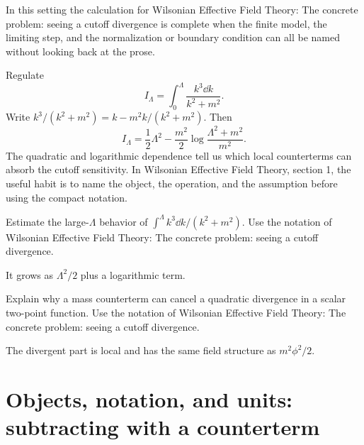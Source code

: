 In this setting the calculation for Wilsonian Effective Field Theory: The concrete problem: seeing a cutoff divergence is complete when the finite model, the limiting step, and the normalization or boundary condition can all be named without looking back at the prose.




\begin{example}
Regulate
\[
  I_\Lambda=\int_0^\Lambda\frac{k^3\dd k}{k^2+m^2}.
\]
Write \(k^3/(k^2+m^2)=k-m^2k/(k^2+m^2)\).  Then
\[
  I_\Lambda=\frac12\Lambda^2-\frac{m^2}{2}\log\frac{\Lambda^2+m^2}{m^2}.
\]
The quadratic and logarithmic dependence tell us which local counterterms can absorb the cutoff sensitivity.  In Wilsonian Effective Field Theory, section 1, the useful habit is to name the object, the operation, and the assumption before using the compact notation.
\end{example}



\begin{exercise}
Estimate the large-\(\Lambda\) behavior of \(\int^\Lambda k^3\dd k/(k^2+m^2)\).  Use the notation of Wilsonian Effective Field Theory: The concrete problem: seeing a cutoff divergence.
\begin{answer}
It grows as \(\Lambda^2/2\) plus a logarithmic term.
\end{answer}
\end{exercise}

\begin{exercise}
Explain why a mass counterterm can cancel a quadratic divergence in a scalar two-point function.  Use the notation of Wilsonian Effective Field Theory: The concrete problem: seeing a cutoff divergence.
\begin{answer}
The divergent part is local and has the same field structure as \(m^2\phi^2/2\).
\end{answer}
\end{exercise}



\section{Objects, notation, and units: subtracting with a counterterm}













